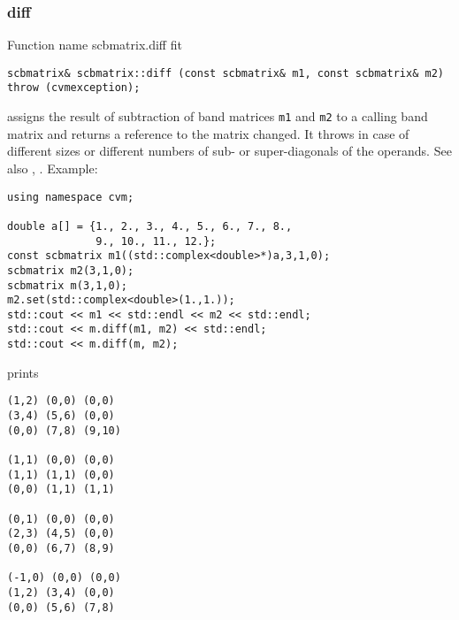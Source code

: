 \subsubsection{diff}
Function%
\pdfdest name {scbmatrix.diff} fit
\begin{verbatim}
scbmatrix& scbmatrix::diff (const scbmatrix& m1, const scbmatrix& m2)
throw (cvmexception);
\end{verbatim}
assigns the result of subtraction of
band matrices \verb"m1" and \verb"m2" to a calling band matrix
and returns a reference to
the matrix changed.
It throws  
in case of different sizes or different numbers of sub- or super-diagonals
of the operands.
See also ,
.
Example:
\begin{Verbatim}
using namespace cvm;

double a[] = {1., 2., 3., 4., 5., 6., 7., 8.,
              9., 10., 11., 12.};
const scbmatrix m1((std::complex<double>*)a,3,1,0);
scbmatrix m2(3,1,0);
scbmatrix m(3,1,0);
m2.set(std::complex<double>(1.,1.));
std::cout << m1 << std::endl << m2 << std::endl;
std::cout << m.diff(m1, m2) << std::endl;
std::cout << m.diff(m, m2);
\end{Verbatim}
prints
\begin{Verbatim}
(1,2) (0,0) (0,0)
(3,4) (5,6) (0,0)
(0,0) (7,8) (9,10)

(1,1) (0,0) (0,0)
(1,1) (1,1) (0,0)
(0,0) (1,1) (1,1)

(0,1) (0,0) (0,0)
(2,3) (4,5) (0,0)
(0,0) (6,7) (8,9)

(-1,0) (0,0) (0,0)
(1,2) (3,4) (0,0)
(0,0) (5,6) (7,8)
\end{Verbatim}
\newpage




